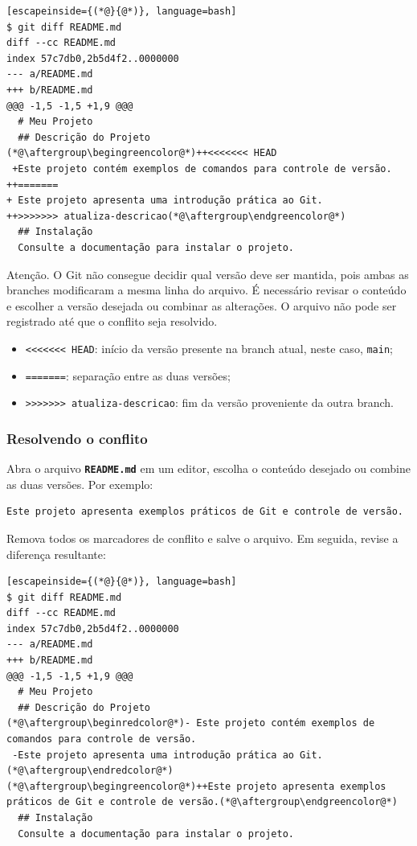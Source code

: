 \documentclass[12pt,a4paper]{article}
\begin{document}
\begin{lstlisting}[escapeinside={(*@}{@*)}, language=bash]
$ git diff README.md
diff --cc README.md
index 57c7db0,2b5d4f2..0000000
--- a/README.md
+++ b/README.md
@@@ -1,5 -1,5 +1,9 @@@
  # Meu Projeto
  ## Descrição do Projeto
(*@\aftergroup\begingreencolor@*)++<<<<<<< HEAD
 +Este projeto contém exemplos de comandos para controle de versão.
++=======
+ Este projeto apresenta uma introdução prática ao Git.
++>>>>>>> atualiza-descricao(*@\aftergroup\endgreencolor@*)
  ## Instalação
  Consulte a documentação para instalar o projeto.
\end{lstlisting}

\begin{question}{Atenção.}
\footnotesize O Git não consegue decidir qual versão deve ser mantida, pois ambas as branches modificaram a mesma linha do arquivo. É necessário revisar o conteúdo e escolher a versão desejada ou combinar as alterações. O arquivo não pode ser registrado até que o conflito seja resolvido.
  \begin{itemize}
    \item \texttt{<<<<<<< HEAD}: início da versão presente na branch atual, neste caso, \texttt{main}; 
    \item \texttt{=======}: separação entre as duas versões; 
    \item \texttt{>>>>>>> atualiza-descricao}: fim da versão proveniente da outra branch. 
  \end{itemize} 
\end{question}

\subsubsection{Resolvendo o conflito} 

Abra o arquivo \textbf{\texttt{README.md}} em um editor, escolha o conteúdo desejado ou combine as duas versões. Por exemplo: 

\begin{lstlisting} 
Este projeto apresenta exemplos práticos de Git e controle de versão. 
\end{lstlisting}

Remova todos os marcadores de conflito e salve o arquivo. Em seguida, revise a diferença resultante:

\begin{lstlisting}[escapeinside={(*@}{@*)}, language=bash]
$ git diff README.md
diff --cc README.md
index 57c7db0,2b5d4f2..0000000
--- a/README.md
+++ b/README.md
@@@ -1,5 -1,5 +1,9 @@@
  # Meu Projeto
  ## Descrição do Projeto
(*@\aftergroup\beginredcolor@*)- Este projeto contém exemplos de comandos para controle de versão.
 -Este projeto apresenta uma introdução prática ao Git.(*@\aftergroup\endredcolor@*)
(*@\aftergroup\begingreencolor@*)++Este projeto apresenta exemplos práticos de Git e controle de versão.(*@\aftergroup\endgreencolor@*)
  ## Instalação
  Consulte a documentação para instalar o projeto.
\end{lstlisting}
\end{document}
